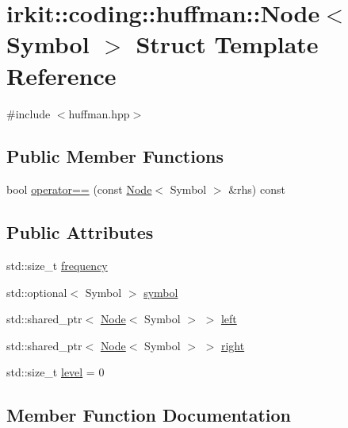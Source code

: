 \hypertarget{structirkit_1_1coding_1_1huffman_1_1Node}{}\section{irkit\+:\+:coding\+:\+:huffman\+:\+:Node$<$ Symbol $>$ Struct Template Reference}
\label{structirkit_1_1coding_1_1huffman_1_1Node}


{\ttfamily \#include $<$huffman.\+hpp$>$}

\subsection*{Public Member Functions}
\begin{DoxyCompactItemize}
\item 
bool \mbox{\hyperlink{structirkit_1_1coding_1_1huffman_1_1Node_a7047266567397b5f603001e874a14e04}{operator==}} (const \mbox{\hyperlink{structirkit_1_1coding_1_1huffman_1_1Node}{Node}}$<$ Symbol $>$ \&rhs) const
\end{DoxyCompactItemize}
\subsection*{Public Attributes}
\begin{DoxyCompactItemize}
\item 
std\+::size\+\_\+t \mbox{\hyperlink{structirkit_1_1coding_1_1huffman_1_1Node_ab341b30efdae2959eca6981cd61cab8f}{frequency}}
\item 
std\+::optional$<$ Symbol $>$ \mbox{\hyperlink{structirkit_1_1coding_1_1huffman_1_1Node_ae3b48f04c2a693e74e3baaafcf2842f1}{symbol}}
\item 
std\+::shared\+\_\+ptr$<$ \mbox{\hyperlink{structirkit_1_1coding_1_1huffman_1_1Node}{Node}}$<$ Symbol $>$ $>$ \mbox{\hyperlink{structirkit_1_1coding_1_1huffman_1_1Node_a55539247b4f143527f03300bce3b0825}{left}}
\item 
std\+::shared\+\_\+ptr$<$ \mbox{\hyperlink{structirkit_1_1coding_1_1huffman_1_1Node}{Node}}$<$ Symbol $>$ $>$ \mbox{\hyperlink{structirkit_1_1coding_1_1huffman_1_1Node_a37ea988a6ef795cb80851347e886d56f}{right}}
\item 
std\+::size\+\_\+t \mbox{\hyperlink{structirkit_1_1coding_1_1huffman_1_1Node_ae358f99d933b40237dad8140f27d1b94}{level}} = 0
\end{DoxyCompactItemize}


\subsection{Member Function Documentation}
\mbox{\label{structirkit_1_1coding_1_1huffman_1_1Node_a7047266567397b5f603001e874a14e04}} 
